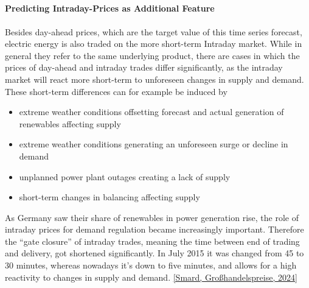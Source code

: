 \documentclass[a4paper]{article}
\providecommand{\tightlist}{%
      \setlength{\itemsep}{0pt}\setlength{\parskip}{0pt}}
\begin{document}
    \begin{center}
    \end{center}
    { \hspace*{\fill} \\}
    
    \begin{center}
    \end{center}
    { \hspace*{\fill} \\}
    
    \begin{center}
    \end{center}
    { \hspace*{\fill} \\}
    
    \paragraph{Predicting Intraday-Prices as Additional
Feature}\label{predicting-intraday-prices-as-additional-feature}

Besides day-ahead prices, which are the target value of this time series
forecast, electric energy is also traded on the more short-term Intraday
market. While in general they refer to the same underlying product,
there are cases in which the prices of day-ahead and intraday trades
differ significantly, as the intraday market will react more short-term
to unforeseen changes in supply and demand. These short-term differences
can for example be induced by

    \begin{itemize}
\tightlist
\item
  extreme weather conditions offsetting forecast and actual generation
  of renewables affecting supply
\item
  extreme weather conditions generating an unforeseen surge or decline
  in demand
\item
  unplanned power plant outages creating a lack of supply
\item
  short-term changes in balancing affecting supply
\end{itemize}

As Germany saw their share of renewables in power generation rise, the
role of intraday prices for demand regulation became increasingly
important. Therefore the ``gate closure'' of intraday trades, meaning
the time between end of trading and delivery, got shortened
significantly. In July 2015 it was changed from 45 to 30 minutes,
whereas nowadays it's down to five minutes, and allows for a high
reactivity to changes in supply and demand. \hyperref[bibliography]{[Smard, Großhandelspreise, 2024]}
\end{document}
